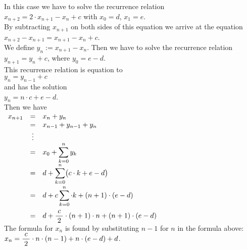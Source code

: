 \begin{enumerate}
\begin{enumerate}
            In this case we have to solve the recurrence relation
            \\[0.2cm]
            \hspace*{1.3cm}
            $x_{n+2} = 2 \cdot x_{n+1} - x_n + c$ \quad with $x_0 = d$, $x_1=e$.
            \\[0.2cm]
            By subtracting $x_{n+1}$ on both sides of this equation we arrive at the equation
            \\[0.2cm]
            \hspace*{1.3cm}
            $x_{n+2} - x_{n+1} = x_{n+1} - x_n + c$.
            \\[0.2cm]
            We define $y_{n} := x_{n+1} - x_n$.  Then we have to solve the recurrence relation
            \\[0.2cm]
            \hspace*{1.3cm}
            $y_{n+1} = y_n + c$, \quad where $y_0 = e - d$.
            \\[0.2cm]
            This recurrence relation is equation to 
            \\[0.2cm]
            \hspace*{1.3cm}
            $y_n = y_{n-1} + c$
            \\[0.2cm]
            and has the solution 
            \\[0.2cm]
            \hspace*{1.3cm}
            $y_n = n \cdot c + e - d$.
            \\[0.2cm]
            Then we have
            \\[0.2cm]
            \hspace*{1.3cm}
            $
            \begin{array}{lcl}
              x_{n+1} & = & x_n + y_n \\
                     & = & x_{n-1} + y_{n-1} + y_n \\
                     & \vdots & \\
                     & = & \displaystyle x_0 + \sum\limits_{k=0}^n y_k \\[0.2cm]
                     & = & \displaystyle d + \sum\limits_{k=0}^n \bigl(c \cdot k + e - d\bigr) \\[0.4cm]
                     & = & \displaystyle d + c \sum\limits_{k=0}^n \cdot k + (n+1) \cdot (e - d) \\[0.5cm]
                     & = & \displaystyle d + \frac{\;c\;}{2} \cdot (n+1) \cdot n + (n+1) \cdot (e - d) 
            \end{array}
            $
            \\[0.2cm]
            The formula for $x_n$ is found by substituting $n-1$ for $n$ in the formula above:
            \\[0.2cm]
            \hspace*{1.3cm}
            $x_n = \displaystyle \frac{\;c\;}{2} \cdot n \cdot (n-1) + n \cdot (e - d) + d$.
      \end{enumerate}
\end{enumerate}
